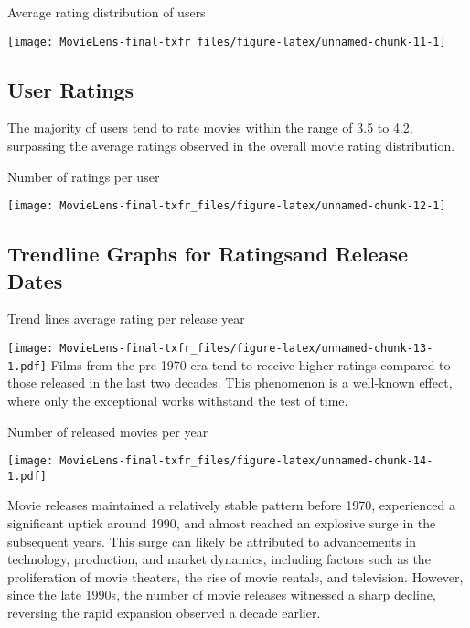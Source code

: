 \documentclass[
]{article}
\begin{document}
\begin{center} Average rating distribution of users \end{center}

\texttt{[image: MovieLens-final-txfr\_files/figure-latex/unnamed-chunk-11-1]}
\newpage

\hypertarget{user-ratings}{%
\subsection{User Ratings}\label{user-ratings}}

The majority of users tend to rate movies within the range of 3.5 to
4.2, surpassing the average ratings observed in the overall movie rating
distribution.

\begin{center} Number of ratings per user \end{center}

\texttt{[image: MovieLens-final-txfr\_files/figure-latex/unnamed-chunk-12-1]}

\newpage

\hypertarget{trendline-graphs-for-ratingsand-release-dates}{%
\subsection{Trendline Graphs for Ratingsand Release
Dates}\label{trendline-graphs-for-ratingsand-release-dates}}

\begin{center} Trend lines average rating per release year \end{center}

\texttt{[image: MovieLens-final-txfr\_files/figure-latex/unnamed-chunk-13-1.pdf]}
Films from the pre-1970 era tend to receive higher ratings compared to
those released in the last two decades. This phenomenon is a well-known
effect, where only the exceptional works withstand the test of time.

\newpage

\begin{center} Number of released movies per year \end{center}

\texttt{[image: MovieLens-final-txfr\_files/figure-latex/unnamed-chunk-14-1.pdf]}

Movie releases maintained a relatively stable pattern before 1970,
experienced a significant uptick around 1990, and almost reached an
explosive surge in the subsequent years. This surge can likely be
attributed to advancements in technology, production, and market
dynamics, including factors such as the proliferation of movie theaters,
the rise of movie rentals, and television. However, since the late
1990s, the number of movie releases witnessed a sharp decline, reversing
the rapid expansion observed a decade earlier.
\end{document}
